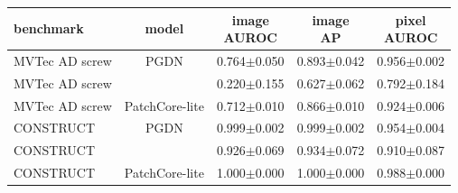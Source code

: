 \setlength{\tabcolsep}{3pt}
\begin{tabular}{@{}lcccc@{}}
\toprule
benchmark & model & \shortstack{image\\AUROC} & \shortstack{image\\AP} & \shortstack{pixel\\AUROC} \\
\midrule
MVTec AD screw & PGDN & 0.764$\pm$0.050 & 0.893$\pm$0.042 & 0.956$\pm$0.002 \\
MVTec AD screw & \draem{} & 0.220$\pm$0.155 & 0.627$\pm$0.062 & 0.792$\pm$0.184 \\
MVTec AD screw & PatchCore-lite & 0.712$\pm$0.010 & 0.866$\pm$0.010 & 0.924$\pm$0.006 \\
CONSTRUCT & PGDN & 0.999$\pm$0.002 & 0.999$\pm$0.002 & 0.954$\pm$0.004 \\
CONSTRUCT & \draem{} & 0.926$\pm$0.069 & 0.934$\pm$0.072 & 0.910$\pm$0.087 \\
CONSTRUCT & PatchCore-lite & 1.000$\pm$0.000 & 1.000$\pm$0.000 & 0.988$\pm$0.000 \\
\bottomrule
\end{tabular}
